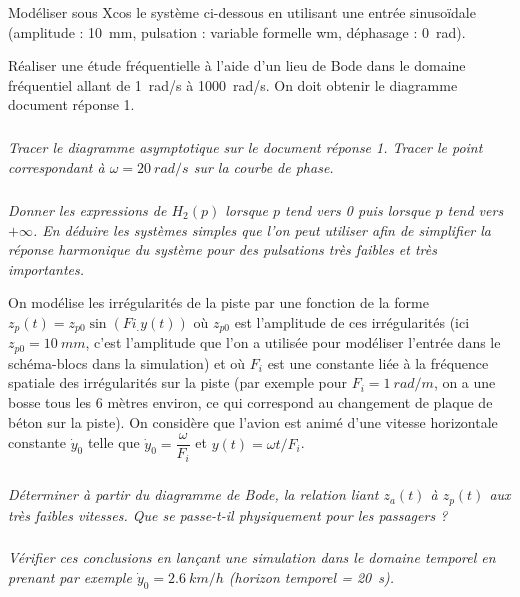 \documentclass[10pt,fleqn]{article} %
\begin{document}
\begin{multicols}{2}
Modéliser sous Xcos le système ci-dessous en
utilisant une entrée sinusoïdale (amplitude : \SI{10}{mm}, pulsation : variable formelle wm,
déphasage : \SI{0}{rad}).

Réaliser une étude fréquentielle à l’aide d’un lieu de Bode dans le domaine fréquentiel allant de \SI{1}{rad/s} à \SI{1000}{rad/s}. On doit obtenir le diagramme document réponse 1.

\subparagraph{}
\textit{Tracer le diagramme asymptotique sur le document réponse 1. Tracer le point correspondant à $\omega=\SI{20}{rad/s}$ sur la courbe de phase.}
\ifprof
\begin{corrige}
\end{corrige}
\else
\fi


\subparagraph{}
\textit{Donner les expressions de $H_2(p)$ lorsque $p$ tend vers 0 puis lorsque $p$
tend vers $+\infty$. En déduire les systèmes simples que l’on peut utiliser afin de simplifier la réponse harmonique du système pour des pulsations très faibles et très importantes.}
\ifprof
\begin{corrige}
\end{corrige}
\else
\fi

On modélise les irrégularités de la piste par une fonction de la forme $z_p(t) = z_{p0}\sin(Fi_.y(t))$ où $z_{p0}$ est l’amplitude
de ces irrégularités (ici $z_{p0}=\SI{10}{mm}$, c’est l’amplitude que l’on a utilisée pour modéliser l’entrée dans le schéma-blocs dans la simulation) et où $F_i$ est une constante liée à la fréquence spatiale des irrégularités sur la piste 
(par exemple pour $F_i = \SI{1}{rad/m}$, on a une bosse tous les 6 mètres environ, ce qui
 correspond au changement de plaque de béton sur la piste). 
 On considère que l’avion est animé d’une vitesse horizontale 
 constante $\dot{y}_0$ telle que
 $\dot{y}_0 = \dfrac{\omega}{F_i}$  et 
 $y(t)=\omega t /F_i$.


\subparagraph{}
\textit{Déterminer à partir du diagramme de Bode, la relation liant $z_a(t)$ à $z_p(t)$ aux très faibles vitesses. Que se passe-t-il physiquement pour les passagers ?}
\ifprof
\begin{corrige}
\end{corrige}
\else
\fi


\subparagraph{}
\textit{Vérifier ces conclusions en lançant une simulation dans le domaine temporel en prenant par exemple $\dot{y}_0=\SI{2,6}{km/h}$ (horizon temporel = \SI{20}{s}).}
\ifprof
\begin{corrige}
\end{corrige}
\else
\fi


\end{multicols}
\end{document}
